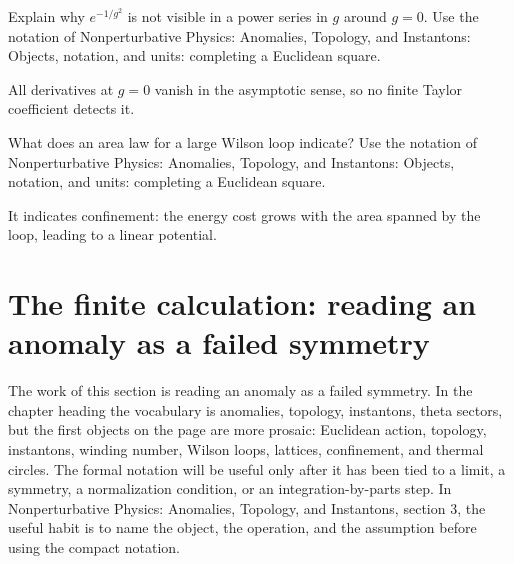 \begin{exercise}
Explain why \(e^{-1/g^2}\) is not visible in a power series in \(g\) around \(g=0\).  Use the notation of Nonperturbative Physics: Anomalies, Topology, and Instantons: Objects, notation, and units: completing a Euclidean square.
\begin{answer}
All derivatives at \(g=0\) vanish in the asymptotic sense, so no finite Taylor coefficient detects it.
\end{answer}
\end{exercise}

\begin{exercise}
What does an area law for a large Wilson loop indicate?  Use the notation of Nonperturbative Physics: Anomalies, Topology, and Instantons: Objects, notation, and units: completing a Euclidean square.
\begin{answer}
It indicates confinement: the energy cost grows with the area spanned by the loop, leading to a linear potential.
\end{answer}
\end{exercise}



\section{The finite calculation: reading an anomaly as a failed symmetry}













The work of this section is reading an anomaly as a failed symmetry.  In the chapter heading the vocabulary is anomalies, topology, instantons, theta sectors, but the first objects on the page are more prosaic: Euclidean action, topology, instantons, winding number, Wilson loops, lattices, confinement, and thermal circles.  The formal notation will be useful only after it has been tied to a limit, a symmetry, a normalization condition, or an integration-by-parts step.  In Nonperturbative Physics: Anomalies, Topology, and Instantons, section 3, the useful habit is to name the object, the operation, and the assumption before using the compact notation.

